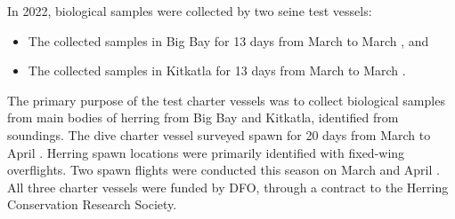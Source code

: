 In 2022, biological samples were collected by two seine test vessels:

\begin{itemize}

\item The  collected samples in Big Bay for 13 days
from March  to March , and

\item The  collected samples in Kitkatla for 13 days
from March  to March .

\end{itemize}

The primary purpose of the test charter vessels was to collect biological samples
from main bodies of herring from Big Bay and Kitkatla,
identified from soundings.
The dive charter vessel  surveyed spawn for 20 days
from March  to April .
Herring spawn locations were primarily identified with fixed-wing overflights.
Two spawn flights were conducted this season on March  and April .
All three charter vessels were funded by DFO,
through a contract to the Herring Conservation Research Society.
